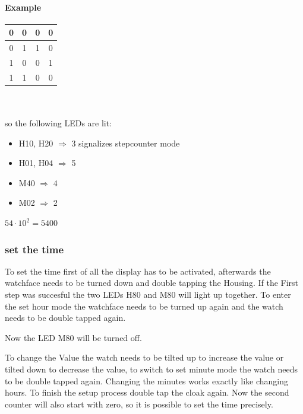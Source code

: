 \paragraph{Example}
\vspace{5mm}

\begin{tabular}{|c|c|c|c|}
\hline 
0 & 0 & 0 & 0 \\ 
\hline 
0 & 1 & 1 & 0 \\ 
\hline 
1 & 0 & 0 & 1 \\ 
\hline 
1 & 1 & 0 & 0 \\ 
\hline 
\end{tabular}\\
\vspace{5mm}\\
so the following LEDs are lit:
\begin{itemize}
	\item H10, H20 $\Rightarrow$ 3 signalizes stepcounter mode
	\item H01, H04 $\Rightarrow$ 5
	\item M40 $\Rightarrow$ 4
	\item M02 $\Rightarrow$ 2
\end{itemize}
$54 \cdot 10 ^{2} = 5400$
\subsubsection{set the time}
To set the time first of all the display has to be activated, afterwards the watchface needs to be turned down and double tapping the Housing.
If the First step was succesful the two LEDs H80 and M80 will light up together. To enter the set hour mode the watchface needs to be turned up again and the watch needs to be double tapped again.

Now the LED M80 will be turned off.

To change the Value the watch needs to be tilted up to increase the value or tilted down to decrease the value, to switch to set minute mode the watch needs to be double tapped again. Changing the minutes works exactly like changing hours. To finish the setup process double tap the cloak again. Now the second counter will also start with zero, so it is possible to set the time precisely.